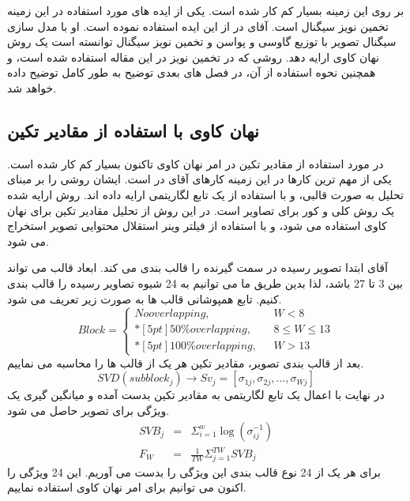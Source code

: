 بر روی این زمینه بسیار کم کار شده است. یکی از ایده های مورد استفاده در این زمینه تخمین نویز سیگنال است. آقای {} در {\cite{Smith2007a}} از این ایده استفاده نموده است. او با مدل سازی سیگنال تصویر با توزیع گاوسی و پواسن و تخمین نویز سیگنال توانسته است یک روش نهان کاوی ارایه دهد. روشی که در تخمین نویز در این مقاله استفاده شده است، و همچنین نحوه استفاده از آن، در فصل های بعدی توضیح به طور کامل توضیح داده خواهد شد. 

\subsection{نهان کاوی با استفاده از مقادیر تکین}
در مورد استفاده از مقادیر تکین در امر نهان کاوی تاکنون بسیار کم کار شده است. یکی از مهم ترین کارها در این زمینه کارهای آقای  در {\cite{Gul2010a,Gu1l2009_NOVEL}} است. ایشان روشی را بر مبنای تحلیل  به صورت قالبی، و با استفاده از یک تابع لگاریتمی ارایه داده اند. روش ارایه شده یک روش کلی و کور برای تصاویر است. در این روش از تحلیل مقادیر تکین برای نهان کاوی استفاده می شود، و با استفاده از فیلتر وینر استقلال محتوایی تصویر استخراج می شود. 

آقای {} ابتدا تصویر رسیده در سمت گیرنده را قالب بندی می کند. ابعاد قالب می تواند بین 3 تا 27 باشد، لذا بدین طریق ما می توانیم به 24 شیوه تصاویر رسیده را قالب بندی کنیم. تابع همپوشانی قالب ها به صورت زیر تعریف می شود.
\begin{equation}
Block = 
\begin{cases}
No overlapping, &\text{ $W< 8$}\\*[5pt]
50\% over lapping, &\text{ $8\leqslant W\leqslant 13$}\\*[5pt]
100\% over lapping, &\text{ $W>13$}
\end{cases}
\end{equation}
بعد از قالب بندی تصویر، مقادیر تکین هر یک از قالب ها را محاسبه می نماییم. 
\begin{equation}
SVD(subblock_{j})\longrightarrow Sv_{j}=[\sigma _{1j},\sigma _{2j},\ldots ,\sigma _{Wj}]
\end{equation}
در نهایت با اعمال یک تابع لگاریتمی به مقادیر تکین بدست آمده و میانگین گیری یک ویژگی برای تصویر حاصل می شود.
\begin{eqnarray}
SVB_{j}&=&\Sigma _{i=1}^{w}\log (\sigma _{ij}^{-1} )\\
F_{W}&=&\frac{1}{TW}\Sigma _{j=1}^{TW}SVB_{j}
\end{eqnarray}
برای هر یک از 24 نوع قالب بندی این ویژگی را بدست می آوریم. این 24 ویژگی را اکنون می توانیم برای امر نهان کاوی استفاده نماییم. 

